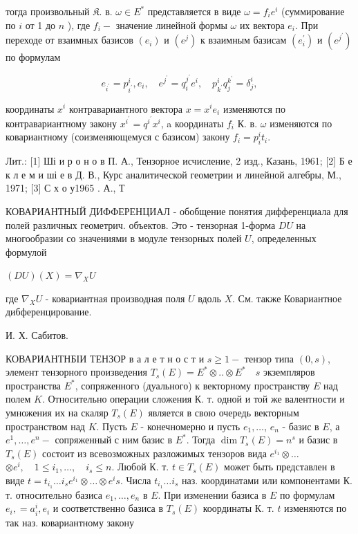 \documentclass[10pt]{article}
\begin{document}
тогда произвольный $\mathfrak{K}$. в. $\omega \in E^{*}$ представляется в виде $\omega=f_{i} e^{i}$ (суммирование по $i$ от 1 до $n$ ), где $f_{i}-$ значение линейной формы $\omega$ их вектора $e_{i}$. При переходе от взаимных базисов $\left(e_{i}\right)$ и $\left(e^{j}\right)$ к взаимным базисам $\left(e_{i}^{\prime}\right)$ и $\left(e^{j^{\prime}}\right)$ по формулам



\[

e_{i^{\prime}}=p_{i^{\prime}}^{i}, e_{i}, \quad e^{j^{\prime}}=q_{i}^{j^{\prime}} e^{i}, \quad p_{k^{\prime}}^{i} q_{j}^{k^{\prime}}=\delta_{j}^{i},

\]



координаты $x^{i}$ контравариантного вектора $x=x^{i} e_{i}$ изменяются по контравариантному закону $x^{i^{\prime}}=q^{i^{\prime}} x^{i}$, a координаты $f_{i}$ К. в. $\omega$ изменяются по ковариантному (соизменяющемуся с базисом) закону $f_{i}=p_{i}^{i} t_{i}$.



Лит.: [1] Ші и р о н о в П. А., Тензорное исчисление, 2 изд., Казань, 1961; [2] Б е к л е м и ші е в Д. В., Курс аналитической геометрии и линейной алгебры, М., 1971; [3] С х о у1965 . А., Т



КОВАРИАНТНЫЙ ДИФФЕРЕНЦИАЛ - обобщение понятия дифференциала для полей различных геометрич. объектов. Это - тензорная 1-форма $D U$ на многообразии со значениями в модуле тензорных полей $U$, определенных формулой



$(D U)(X)=\nabla_{X} U$



где $\nabla_{X} U$ - ковариантная производная поля $U$ вдоль $X$. См. также Ковариантное дибференцирование.



И. Х. Сабитов.



КОВАРИАНТНБІИ ТЕНЗОР в а л е т н о с т и $s \geqslant 1-$ тензор типа $(0, s)$, элемент тензорного произведения $T_{s}(E)=E^{*} \otimes . . \otimes E^{*} \quad s$ экземпляров пространства $E^{*}$, сопряженного (дуального) к векторному пространству $E$ над полем $K$. Относительно операции сложения К. т. одной и той же валентности и умножения их на скаляр $T_{s}(E)$ является в свою очередь векторным пространством над $K$. Пусть $E$ - конечномерно и пусть $e_{1}, \ldots$, $e_{n}$ - базис в $E$, а $e^{1}, \ldots, e^{n}-$ сопряженный с ним базис в $E^{*}$. Тогда $\operatorname{dim} T_{s}(E)=n^{s}$ и базис в $T_{s}(E)$ состоит из всевозможных разложимых тензоров вида $e^{i_{1}} \otimes \ldots$ $\otimes e^{i}, \quad 1 \leqslant i_{1}, \ldots, \quad i_{s} \leqslant n$. Любой К. т. $t \in T_{s}(E)$ может быть представлен в виде $t=t_{i_{1}} \ldots i_{s} e^{i_{1}} \otimes \ldots \otimes e^{i} s$. Числа $t_{i_{1}} \ldots i_{s}$ наз. координатами или компонентами К. т. относительно базиса $e_{1}, \ldots, e_{n}$ в $E$. При изменении базиса в $E$ по формулам $e_{i},=a_{i}^{i}, e_{i}$ и соответственно базиса в $T_{s}(E)$ координаты К. т. $t$ изменяются по так наз. ковариантному закону
\end{document}
